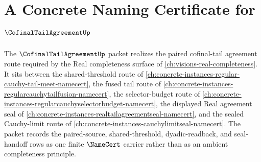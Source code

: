 \chapter{A Concrete Naming Certificate for $\CofinalTailAgreementUp$}
\label{ch:concrete-instances-cofinaltailagreement-namecert}

The $\CofinalTailAgreementUp$ packet realizes the paired cofinal-tail agreement route required by the Real completeness surface of \autoref{ch:visions-real-completeness}. It sits between the shared-threshold route of \autoref{ch:concrete-instances-regular-cauchy-tail-meet-namecert}, the fused tail route of \autoref{ch:concrete-instances-regularcauchytailfusion-namecert}, the selector-budget route of \autoref{ch:concrete-instances-regularcauchyselectorbudget-namecert}, the displayed Real agreement seal of \autoref{ch:concrete-instances-realtailagreementseal-namecert}, and the sealed Cauchy-limit route of \autoref{ch:concrete-instances-cauchylimitseal-namecert}. The packet records the paired-source, shared-threshold, dyadic-readback, and seal-handoff rows as one finite $\NameCert$ carrier rather than as an ambient completeness principle.

